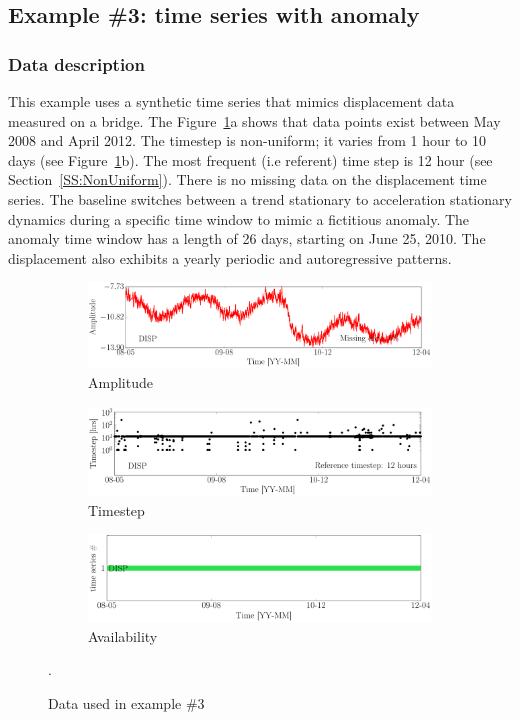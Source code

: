\subsection{Example \#3: time series with anomaly}
\label{S:ExampleDispAnomaly}


\subsubsection{Data description}
This example uses a synthetic time series that mimics displacement data measured on a bridge. 
The Figure~\ref{fig:DataSummaryRaw3}a shows that data points exist between May 2008 and April 2012.
The timestep is non-uniform; it varies from 1 hour to 10 days (see Figure~\ref{fig:DataSummaryRaw3}b). 
The most frequent (i.e referent) time step is 12 hour (see Section~\ref{SS:NonUniform}).
There is no missing data on the displacement time series.
The baseline switches between a trend stationary to acceleration stationary dynamics during a specific time window to mimic a fictitious anomaly.
The anomaly time window has a length of 26 days, starting on June 25, 2010.
The displacement also exhibits a yearly periodic and autoregressive patterns.

\begin{figure}[h!]
\centering
\begin{subfigure}{\linewidth}
\includegraphics[width=0.9\linewidth]{./docfigs/Example_DISPSIM_ANOMALY/raw/ALL_AMPLITUDES.pdf} 
\caption{Amplitude}
\end{subfigure}
\begin{subfigure}{\linewidth}
\includegraphics[width=0.9\linewidth]{./docfigs/Example_DISPSIM_ANOMALY/raw/ALL_TIMESTEPS.pdf}
\caption{Timestep}
\end{subfigure}
\begin{subfigure}{\linewidth}
\includegraphics[width=0.9\linewidth]{./docfigs/Example_DISPSIM_ANOMALY/raw/AVAILABILITY.pdf}
\caption{Availability}
\end{subfigure}
\caption{Data used in example \#3}.
\label{fig:DataSummaryRaw3}
\end{figure}



